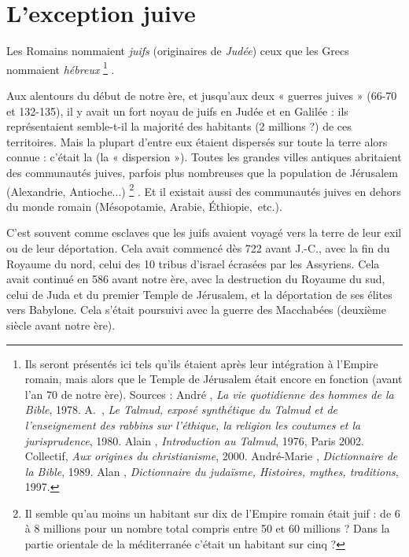

\chapter{L'exception juive}

 Les Romains nommaient \emph{juifs} (originaires de \emph{Judée}) ceux que les Grecs nommaient \emph{hébreux}%
\footnote{Ils seront présentés ici tels qu'ils étaient après leur intégration à l'Empire romain, mais alors que le Temple de Jérusalem était encore en fonction (avant l'an 70 de notre ère).
Sources : André , \emph{La vie quotidienne des hommes de la Bible}, 1978. A.~, \emph{Le Talmud, exposé synthétique du Talmud et de l'enseignement des rabbins sur l'éthique, la religion les coutumes et la jurisprudence}, 1980. Alain , \emph{Introduction au Talmud}, 1976, Paris 2002. Collectif, \emph{Aux origines du christianisme}, 2000. André-Marie , \emph{Dictionnaire de la Bible}, 1989. Alan , \emph{Dictionnaire du judaïsme, Histoires, mythes, traditions}, 1997.}%
.

 Aux alentours du début de notre ère, et jusqu'aux deux « guerres juives » (\hbox{66-70} et \hbox{132-135}), il y avait un fort noyau de juifs en Judée et en Galilée : ils représentaient semble-t-il la majorité des habitants (2 millions ?) de ces territoires. Mais la plupart d'entre eux étaient dispersés sur toute la terre alors connue : c'était la  (la « dispersion »). Toutes les grandes villes antiques abritaient des communautés juives, parfois plus nombreuses que la population de Jérusalem (Alexandrie, Antioche...)%
\footnote{Il semble qu'au moins un habitant sur dix de l'Empire romain était juif : de 6 à 8 millions pour un nombre total compris entre 50 et 60 millions ? Dans la partie orientale de la méditerranée c'était un habitant sur cinq ?}%
. Et il existait aussi des communautés juives en dehors du monde romain (Mésopotamie, Arabie, Éthiopie,~etc.).

 C'est souvent comme esclaves que les juifs avaient voyagé vers la terre de leur exil ou de leur déportation. Cela avait commencé dès 722 avant J.-C., avec la fin du Royaume du nord, celui des 10 tribus d'israel écrasées par les Assyriens. Cela avait continué en 586 avant notre ère, avec la destruction du Royaume du sud, celui de Juda et du premier Temple de Jérusalem, et la déportation de ses élites vers Babylone. Cela s'était poursuivi avec la guerre des Macchabées (deuxième siècle avant notre ère). 
 
